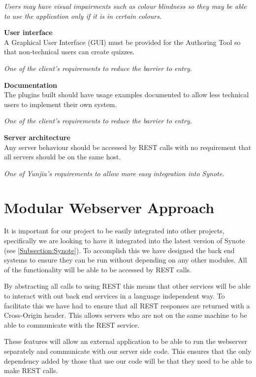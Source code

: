 \begin{requirement}[label=\textbf{N\arabic*}]
\textit{Users may have visual impairments such as colour blindness so they may be able to use the application only if it is in certain colours.}
\item \textbf{User interface} \label{Req:User interface} \hfill \\ A Graphical User Interface (GUI) must be provided for the Authoring Tool so that non-technical users can create quizzes.

\textit{One of the client's requirements to reduce the barrier to entry.}
\item \textbf{Documentation} \label{Req:Documentation} \hfill \\ The plugins built should have usage examples documented to allow less technical users to implement their own system.

\textit{One of the client's requirements to reduce the barrier to entry.}
\item \textbf{Server architecture} \label{Req:Server architecture} \hfill \\ Any server behaviour should be accessed by \gls{REST} calls with no requirement that all servers should be on the same host.

\textit{One of Yunjia's requirements to allow more easy integration into Synote.}
\end{requirement}

\section{Modular Webserver Approach}
\label{Section:Modular Approach}
It is important for our project to be easily integrated into other projects, specifically we are looking to have it integrated into the latest version of Synote (see \autoref{Subsection:Synote}). To accomplish this we have designed the back end systems to ensure they can be run without depending on any other modules. All of the functionality will be able to be accessed by \gls{REST} calls.

By abstracting all calls to using \gls{REST} this means that other services will be able to interact with out back end services in a language independent way. To facilitate this we have had to ensure that all \gls{REST} responses are returned with a Cross-Origin header. This allows servers who are not on the same machine to be able to communicate with the \gls{REST} service.

These features will allow an external application to be able to run the webserver separately and communicate with our server side code. This ensures that the only dependency added by those that use our code will be that they need to be able to make \gls{REST} calls.

